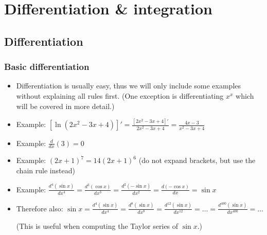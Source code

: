 \iffalse

MIT License

Copyright (c) 2023-2025 Aron Hardeman

Permission is hereby granted, free of charge, to any person obtaining a copy
of this software and associated documentation files (the "Software"), to deal
in the Software without restriction, including without limitation the rights
to use, copy, modify, merge, publish, distribute, sublicense, and/or sell
copies of the Software, and to permit persons to whom the Software is
furnished to do so, subject to the following conditions:

The above copyright notice and this permission notice shall be included in all
copies or substantial portions of the Software.

THE SOFTWARE IS PROVIDED "AS IS", WITHOUT WARRANTY OF ANY KIND, EXPRESS OR
IMPLIED, INCLUDING BUT NOT LIMITED TO THE WARRANTIES OF MERCHANTABILITY,
FITNESS FOR A PARTICULAR PURPOSE AND NONINFRINGEMENT. IN NO EVENT SHALL THE
AUTHORS OR COPYRIGHT HOLDERS BE LIABLE FOR ANY CLAIM, DAMAGES OR OTHER
LIABILITY, WHETHER IN AN ACTION OF CONTRACT, TORT OR OTHERWISE, ARISING FROM,
OUT OF OR IN CONNECTION WITH THE SOFTWARE OR THE USE OR OTHER DEALINGS IN THE
SOFTWARE.

\fi\section{Differentiation \& integration}
\subsection{Differentiation}
\begin{frame}

\frametitle{Basic differentiation}

\begin{itemize}
\item  Differentiation is usually easy, thus we will only include some examples without explaining all rules first. (One exception is differentiating $x^x$ which will be covered in more detail.)
\pause\item Example: $[\ln(2x^2-3x+4)]'=\frac{[2x^2-3x+4]'}{2x^2-3x+4}=\frac{4x-3}{x^2-3x+4}$
\pause\item Example: $\frac{d}{dx}(3) = 0$
\pause\item Example: $(2x+1)^{7}=14(2x+1)^6$ (do not expand brackets, but use the chain rule instead) 
\pause\item Example: $\frac{d^4(\sin x)}{dx^4}=\frac{d^3(\cos x)}{dx^3}=\frac{d^2(-\sin x)}{dx^2}=\frac{d(-\cos x)}{dx}=\sin x$
\pause\item Therefore also: $\sin x = \frac{d^4(\sin x)}{dx^4} =  \frac{d^8(\sin x)}{dx^8} =  \frac{d^{12}(\sin x)}{dx^{12}}=  \hdots=\frac{d^{400}(\sin x)}{dx^{400}}=\hdots$

(This is useful when computing the Taylor series of $\sin x$.)
\end{itemize}


\end{frame}

